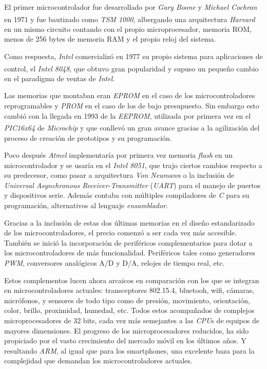 El primer microcontrolador fue desarrollado por \textit{Gary Boone} y
\textit{Michael Cochran} en 1971 y fue bautizado como
\textit{TSM 1000}\textsuperscript{\cite{mccon}}, albergando una arquitectura
\textit{Harvard} en un mismo circuito contando con el propio microprocesador,
memoria ROM, menos de 256 bytes de memoria RAM y el propio reloj del sistema.

Como respuesta, \textit{Intel} comercializó en 1977 su propio sistema para
aplicaciones de control, el \textit{Intel 8048}\textsuperscript{\cite{mcs48}},
que obtuvo gran popularidad y supuso un pequeño cambio en el paradigma de
ventas de \textit{Intel}.

Las memorias que montaban eran \textit{EPROM} en el caso de los microcontroladores
reprogramables y \textit{PROM} en el caso de los de bajo  presupuesto. Sin embargo esto
cambió con la llegada en 1993 de la \textit{EEPROM}, utilizada por primera vez
en el \textit{PIC16x64}\textsuperscript{\cite{mccon}} de \textit{Microchip} y que conllevó un gran avance
gracias a la agilización del proceso de creación de prototipos y su programación.

Poco después \textit{Atmel} implementaría por primera vez memoria \textit{flash}
en un microcontrolador y se usaría en el \textit{Intel 8051}, que trajo
ciertos cambios respecto a su predecesor, como pasar a arquitectura
\textit{Von Neumann} o la inclusión de
\textit{Universal Asynchronous Receiver-Transmitter}
(\textit{UART}) para el manejo de puertos y dispositivos serie. Además contaba
con múltiples compiladores de \textit{C} para su programación, alternativos
al lenguaje \textit{ensamblador}.

Gracias a la inclusión de estas dos últimas memorias en el diseño estandarizado de
los microcontroladores, el precio comenzó a ser cada vez más accesible.
También se inició la incorporación de periféricos complementarios para dotar
a los microcontroladores de más funcionalidad. Periféricos tales como generadores
\textit{PWM}, conversores analógicos A/D y D/A, relojes de tiempo real, etc.

Estos complementos lucen ahora arcaicos en comparación con los que se integran
en microcontroladores actuales: transceptores 802.15.4, bluetooh, wifi, cámaras,
micrófonos, y sensores de todo tipo como de presión, movimiento, orientación, color,
brillo, proximidad, humedad, etc. Todos estos acompañados de complejos microprocesadores
de 32 bits, cada vez más semejantes a las \textit{CPU}s de equipos de mayores
dimensiones. El progreso de los microprocesadores reducidos, ha sido propiciado
por el vasto crecimiento del mercado móvil en los últimos años. Y resultando
\textit{ARM}, al igual que para los smartphones, una excelente baza para la
complejidad que demandan los microcontroladores actuales.


